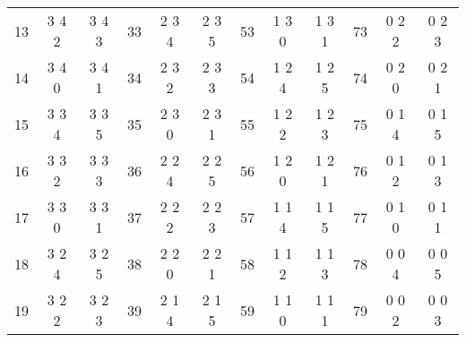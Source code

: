 \begin{table}[p]
{\begin{center}
\begin{tabular}{ccc|ccc|ccc|ccc}
	13  &	3   4	2   &	3   4	3   &	33  &	2   3	4   &	2   3	5   &	53  &	1   3	0   &	1   3	1   &	73  &	0   2	2   &	0   2	3   \\
	14  &	3   4	0   &	3   4	1   &	34  &	2   3	2   &	2   3	3   &	54  &	1   2	4   &	1   2	5   &	74  &	0   2	0   &	0   2	1   \\
	15  &	3   3	4   &	3   3	5   &	35  &	2   3	0   &	2   3	1   &	55  &	1   2	2   &	1   2	3   &	75  &	0   1	4   &	0   1	5   \\
	16  &	3   3	2   &	3   3	3   &	36  &	2   2	4   &	2   2	5   &	56  &	1   2	0   &	1   2	1   &	76  &	0   1	2   &	0   1	3   \\
	17  &	3   3	0   &	3   3	1   &	37  &	2   2	2   &	2   2	3   &	57  &	1   1	4   &	1   1	5   &	77  &	0   1	0   &	0   1	1   \\
	18  &	3   2	4   &	3   2	5   &	38  &	2   2	0   &	2   2	1   &	58  &	1   1	2   &	1   1	3   &	78  &	0   0	4   &	0   0	5   \\
	19  &	3   2	2   &	3   2	3   &	39  &	2   1	4   &	2   1	5   &	59  &	1   1	0   &	1   1	1   &	79  &	0   0	2   &	0   0	3   \\
	\bottomrule
 \end{tabular}
    \end{center}
}
 \label{tab:pixeladdr}
 \end{table}

